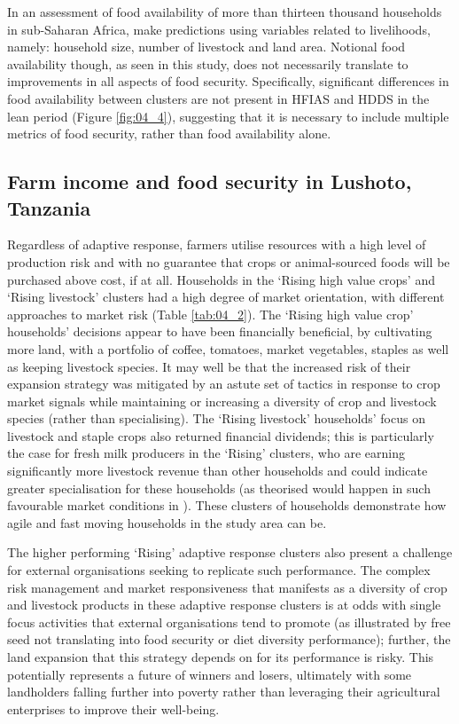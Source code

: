 In an assessment of food availability of more than thirteen thousand households in sub-Saharan Africa, \citet{Frelat2016458} make predictions using variables related to livelihoods, namely: household size, number of livestock and land area. Notional food availability though, as seen in this study, does not necessarily translate to improvements in all aspects of food security. Specifically, significant differences in food availability between clusters are not present in HFIAS and HDDS in the lean period (Figure \ref{fig:04_4}), suggesting that it is necessary to include multiple metrics of food security, rather than food availability alone.

\subsection{Farm income and food security in Lushoto, Tanzania}

Regardless of adaptive response, farmers utilise resources with a high level of production risk and with no guarantee that crops or animal-sourced foods will be purchased above cost, if at all. Households in the `Rising high value crops' and `Rising livestock' clusters had a high degree of market orientation, with different approaches to market risk (Table \ref{tab:04_2}). The `Rising high value crop' households' decisions appear to have been financially beneficial, by cultivating more land, with a portfolio of coffee, tomatoes, market vegetables, staples as well as keeping livestock species. It may well be that the increased risk of their expansion strategy was mitigated by an astute set of tactics in response to crop market signals while maintaining or increasing a diversity of crop and livestock species (rather than specialising). The `Rising livestock' households' focus on livestock and staple crops also returned financial dividends; this is particularly the case for fresh milk producers in the `Rising' clusters, who are earning significantly more livestock revenue than other households and could indicate greater specialisation for these households (as theorised would happen in such favourable market conditions in \citealp{McIntire1992}). These clusters of households demonstrate how agile and fast moving households in the study area can be.

The higher performing `Rising' adaptive response clusters also present a challenge for external organisations seeking to replicate such performance. The complex risk management and market responsiveness that manifests as a diversity of crop and livestock products in these adaptive response clusters is at odds with single focus activities that external organisations tend to promote (as illustrated by free seed not translating into food security or diet diversity performance); further, the land expansion that this strategy depends on for its performance is risky. This potentially represents a future of winners and losers, ultimately with some landholders falling further into poverty rather than leveraging their agricultural enterprises to improve their well-being.

